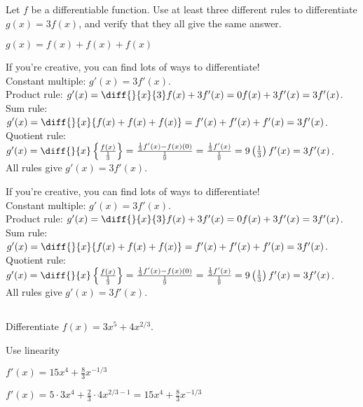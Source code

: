 \begin{question}Let $f$ be a differentiable function. Use at least three different rules to differentiate\\ $g(x)=3f(x)$, and verify that they all give the same answer.
\end{question}
\begin{hint} $g(x)=f(x)+f(x)+f(x)$
\end{hint}
\begin{answer} If you're creative, you can find lots of ways to differentiate!\\
Constant multiple: $g'(x)=3f'(x)$.\\
Product rule: $g'(x) = \diff{}{x}\{3\}f(x)+3f'(x)=0f(x)+3f'(x)=3f'(x)$.\\
Sum rule: $g'(x)=\diff{}{x}\{f(x)+f(x)+f(x)\}=f'(x)+f'(x)+f'(x)=3f'(x)$.\\
Quotient rule: $g'(x)=\diff{}{x}\left\{\frac{f(x)}{\frac{1}{3}}\right\}=
\frac{\frac{1}{3}f'(x)-f(x)(0)}{\frac{1}{9}}=\frac{\frac{1}{3}f'(x)}{\frac{1}{9}}=9\left(\frac{1}{3}\right)f'(x)=3f'(x)$.\\
All rules give $g'(x)=3f'(x)$.
\end{answer}
\begin{solution} If you're creative, you can find lots of ways to differentiate!\\
Constant multiple: $g'(x)=3f'(x)$.\\
Product rule: $g'(x) = \diff{}{x}\{3\}f(x)+3f'(x)=0f(x)+3f'(x)=3f'(x)$.\\
Sum rule: $g'(x)=\diff{}{x}\{f(x)+f(x)+f(x)\}=f'(x)+f'(x)+f'(x)=3f'(x)$.\\
Quotient rule: $g'(x)=\diff{}{x}\left\{\frac{f(x)}{\frac{1}{3}}\right\}=
\frac{\frac{1}{3}f'(x)-f(x)(0)}{\frac{1}{9}}=\frac{\frac{1}{3}f'(x)}{\frac{1}{9}}=9\left(\frac{1}{3}\right)f'(x)=3f'(x)$.\\
All rules give $g'(x)=3f'(x)$.
\end{solution}



\subsection*{\Procedural}

\begin{question}Differentiate $f(x)=3x^5+4x^{2/3}$.
\end{question}
\begin{hint} Use linearity
\end{hint}
\begin{answer} $f'(x)=15x^4+\frac{8}{3}x^{-1/3}$
\end{answer}
\begin{solution}
$f'(x)=5\cdot 3x^4+\frac{2}{3}\cdot 4x^{2/3-1}
=15x^4+\frac{8}{3}x^{-1/3}$
\end{solution}






